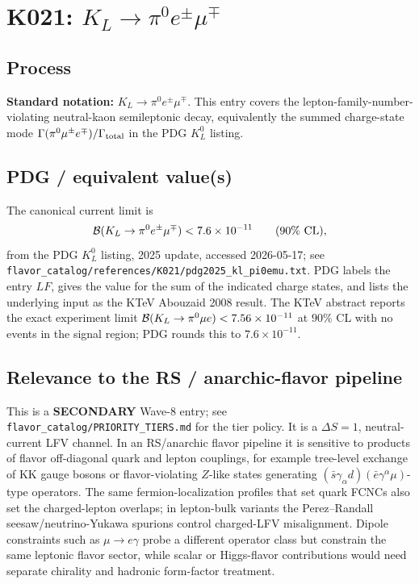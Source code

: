 
\section{K021: \(K_L \to \pi^0 e^{\pm}\mu^{\mp}\)}

\subsection*{Process}
\textbf{Standard notation:} \(K_L \to \pi^0 e^{\pm}\mu^{\mp}\).  This
entry covers the lepton-family-number-violating neutral-kaon semileptonic
decay, equivalently the summed charge-state mode
\(\Gamma(\pi^0\mu^\pm e^\mp)/\Gamma_{\rm total}\) in the PDG \(K_L^0\)
listing.

\subsection*{PDG / equivalent value(s)}
The canonical current limit is
\[
  {\cal B}(K_L\to\pi^0 e^{\pm}\mu^{\mp}) < 7.6\times10^{-11}
  \qquad (90\%~{\rm CL}),
\]
from the PDG \(K_L^0\) listing, 2025 update, accessed 2026-05-17; see
\texttt{flavor\_catalog/references/K021/pdg2025\_kl\_pi0emu.txt}.  PDG labels
the entry \(LF\), gives the value for the sum of the indicated charge states,
and lists the underlying input as the KTeV Abouzaid 2008 result.  The KTeV
abstract reports the exact experiment limit
\({\cal B}(K_L\to\pi^0\mu e)<7.56\times10^{-11}\) at \(90\%\) CL with no
events in the signal region; PDG rounds this to \(7.6\times10^{-11}\).

\subsection*{Relevance to the RS / anarchic-flavor pipeline}
This is a \textbf{SECONDARY} Wave-8 entry; see
\texttt{flavor\_catalog/PRIORITY\_TIERS.md} for the tier policy.  It is a
\(\Delta S=1\), neutral-current LFV channel.  In an RS/anarchic
flavor pipeline it is sensitive to products of flavor off-diagonal quark and
lepton couplings, for example tree-level exchange of KK gauge bosons or
flavor-violating \(Z\)-like states generating
\((\bar s\gamma_\alpha d)(\bar e\gamma^\alpha\mu)\)-type operators.  The same
fermion-localization profiles that set quark FCNCs also set the charged-lepton
overlaps; in lepton-bulk variants the Perez--Randall seesaw/neutrino-Yukawa
spurions control charged-LFV misalignment.  Dipole constraints such as
\(\mu\to e\gamma\) probe a different operator class but constrain the same
leptonic flavor sector, while scalar or Higgs-flavor contributions would need
separate chirality and hadronic form-factor treatment.

